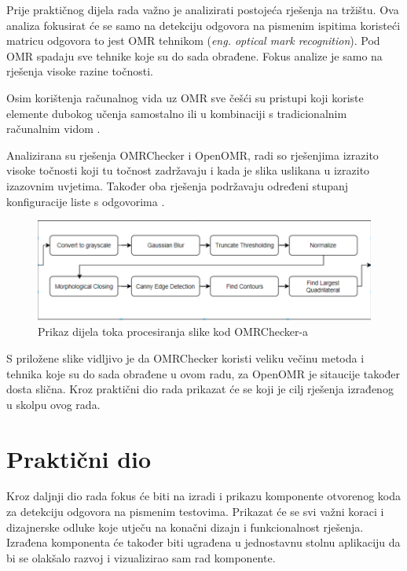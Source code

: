 \documentclass{foi}
\begin{document}
Prije praktičnog dijela rada važno je analizirati postojeća rješenja na tržištu. Ova analiza fokusirat će se samo na detekciju odgovora na pismenim ispitima koristeći matricu odgovora to jest OMR tehnikom (\textit{eng. optical mark recognition}). Pod OMR spadaju sve tehnike koje su do sada obrađene. Fokus analize je samo na rješenja visoke razine točnosti.

Osim korištenja računalnog vida uz OMR sve češći su pristupi koji koriste elemente dubokog učenja samostalno ili u kombinaciji s tradicionalnim računalnim vidom \cite{OMRComparsion}.

Analizirana su rješenja OMRChecker i OpenOMR, radi so rješenjima izrazito visoke točnosti koji tu točnost zadržavaju i kada je slika uslikana u izrazito izazovnim uvjetima. Također oba rješenja podržavaju određeni stupanj konfiguracije liste s odgovorima \cite{OMRComparsion}.

\begin{figure}[H]
    \centering
    \includegraphics[width=1.0\linewidth]{slike/omr_flow.png}
    \caption{Prikaz dijela toka procesiranja slike kod OMRChecker-a \cite{OMRChecker}}
\end{figure}

S priložene slike vidljivo je da OMRChecker koristi veliku večinu metoda i tehnika koje su do sada obrađene u ovom radu, za OpenOMR je sitaucije također dosta slična.
Kroz praktični dio rada prikazat će se koji je cilj rješenja izrađenog u skolpu ovog rada.

\chapter{Praktični dio}

Kroz daljnji dio rada fokus će biti na izradi i prikazu komponente otvorenog koda za detekciju odgovora na pismenim testovima. Prikazat će se svi važni koraci i dizajnerske odluke koje utječu na konačni dizajn i funkcionalnost rješenja. Izrađena komponenta će također biti ugrađena u jednostavnu stolnu aplikaciju da bi se olakšalo razvoj i vizualizirao sam rad komponente. 
\end{document}
